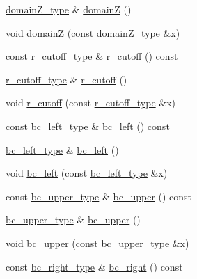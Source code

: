 \begin{DoxyCompactItemize}
\item 
\hyperlink{classsetting__t_a2257367cc1475e2a9b1b2a82dbdaddaf}{domain\+Z\+\_\+type} \& \hyperlink{classsetting__t_ad539ef029b941319f8971db3058ee24c}{domainZ} ()
\item 
void \hyperlink{classsetting__t_a77141c34ecb02943c591ecfa788452a3}{domainZ} (const \hyperlink{classsetting__t_a2257367cc1475e2a9b1b2a82dbdaddaf}{domain\+Z\+\_\+type} \&x)
\item 
const \hyperlink{classsetting__t_ac5da16857addda387f3269e0a1a0cafa}{r\+\_\+cutoff\+\_\+type} \& \hyperlink{classsetting__t_a06ec2fda4155e7afc18a817520e86fd8}{r\+\_\+cutoff} () const 
\item 
\hyperlink{classsetting__t_ac5da16857addda387f3269e0a1a0cafa}{r\+\_\+cutoff\+\_\+type} \& \hyperlink{classsetting__t_afaa8c3295facef40e87faf4a7b487fde}{r\+\_\+cutoff} ()
\item 
void \hyperlink{classsetting__t_a2e5087c6e34c786734cb7b45f65a1d6b}{r\+\_\+cutoff} (const \hyperlink{classsetting__t_ac5da16857addda387f3269e0a1a0cafa}{r\+\_\+cutoff\+\_\+type} \&x)
\item 
const \hyperlink{classsetting__t_a182532ef9d6146add054e0118af040f2}{bc\+\_\+left\+\_\+type} \& \hyperlink{classsetting__t_acebf673058d2f8618b44600ee39a11f6}{bc\+\_\+left} () const 
\item 
\hyperlink{classsetting__t_a182532ef9d6146add054e0118af040f2}{bc\+\_\+left\+\_\+type} \& \hyperlink{classsetting__t_aec9bc74e725b2b1cbf8e9953d20a3e73}{bc\+\_\+left} ()
\item 
void \hyperlink{classsetting__t_adca3da620b5a0c6f08af7d7f4b7b4181}{bc\+\_\+left} (const \hyperlink{classsetting__t_a182532ef9d6146add054e0118af040f2}{bc\+\_\+left\+\_\+type} \&x)
\item 
const \hyperlink{classsetting__t_abf5df957f10853c7b6a54a0073cd61fa}{bc\+\_\+upper\+\_\+type} \& \hyperlink{classsetting__t_aa8d290c77bf1200ca4498c8e9563b328}{bc\+\_\+upper} () const 
\item 
\hyperlink{classsetting__t_abf5df957f10853c7b6a54a0073cd61fa}{bc\+\_\+upper\+\_\+type} \& \hyperlink{classsetting__t_a87dda9514e4bd455bbb6833d41baf34d}{bc\+\_\+upper} ()
\item 
void \hyperlink{classsetting__t_a8b520e667ea169072569f9cf92be1e8e}{bc\+\_\+upper} (const \hyperlink{classsetting__t_abf5df957f10853c7b6a54a0073cd61fa}{bc\+\_\+upper\+\_\+type} \&x)
\item 
const \hyperlink{classsetting__t_a958fcc958aca728509db3a1f3756a0c9}{bc\+\_\+right\+\_\+type} \& \hyperlink{classsetting__t_a06e2c7dd0a73c4eefc1710f6ddd77990}{bc\+\_\+right} () const 

\end{DoxyCompactItemize}
